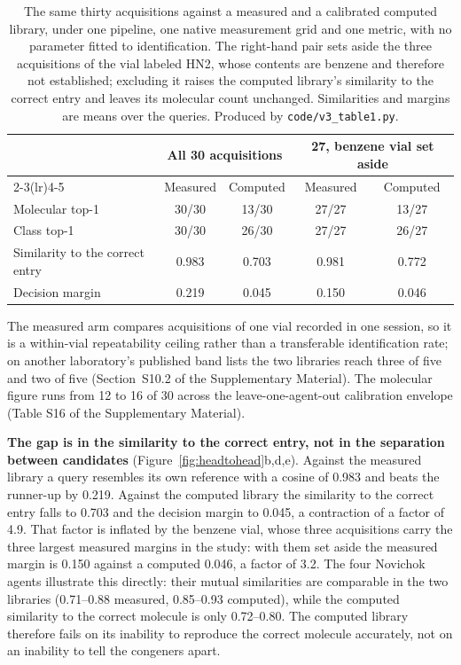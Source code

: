 \documentclass[review,12pt]{elsarticle}
\begin{document}
\begin{table}[htbp]
\centering
\caption{The same thirty acquisitions against a measured and a calibrated computed library, under one pipeline, one native measurement grid and one metric, with no parameter fitted to identification. The right-hand pair sets aside the three acquisitions of the vial labeled HN2, whose contents are benzene and therefore not established; excluding it raises the computed library's similarity to the correct entry and leaves its molecular count unchanged. Similarities and margins are means over the queries. Produced by \texttt{code/v3\_table1.py}.}
\label{tab:headline}
\small
\begin{tabular}{lcccc}
\toprule
 & \multicolumn{2}{c}{All 30 acquisitions} & \multicolumn{2}{c}{27, benzene vial set aside} \\
\cmidrule(lr){2-3}\cmidrule(lr){4-5}
 & Measured & Computed & Measured & Computed \\
\midrule
Molecular top-1 & 30/30 & 13/30 & 27/27 & 13/27 \\
Class top-1 & 30/30 & 26/30 & 27/27 & 26/27 \\
Similarity to the correct entry & 0.983 & 0.703 & 0.981 & 0.772 \\
Decision margin & 0.219 & 0.045 & 0.150 & 0.046 \\
\bottomrule
\end{tabular}

\begin{flushleft}\footnotesize The measured arm compares acquisitions of one vial recorded in one session, so it is a within-vial repeatability ceiling rather than a transferable identification rate; on another laboratory's published band lists the two libraries reach three of five and two of five (Section~S10.2 of the Supplementary Material). The molecular figure runs from 12 to 16 of 30 across the leave-one-agent-out calibration envelope (Table S16 of the Supplementary Material).\end{flushleft}
\end{table}

\textbf{The gap is in the similarity to the correct entry, not in the separation between
candidates} (Figure~\ref{fig:headtohead}b,d,e). Against the measured library a query
resembles its own reference with a cosine of 0.983 and beats the runner-up by 0.219.
Against the computed library the similarity to the correct entry falls to 0.703 and the
decision margin to 0.045, a contraction of a factor of 4.9. That factor is inflated by the
benzene vial, whose three acquisitions carry the three largest measured margins in the
study: with them set aside the measured margin is 0.150 against a computed 0.046, a factor
of 3.2. The four Novichok agents illustrate
this directly: their mutual similarities are comparable in the two libraries
(0.71--0.88 measured, 0.85--0.93 computed), while the computed similarity to the correct
molecule is only 0.72--0.80. The computed library therefore fails on its inability to
reproduce the correct molecule accurately, not on an inability to tell the congeners
apart.
\end{document}
